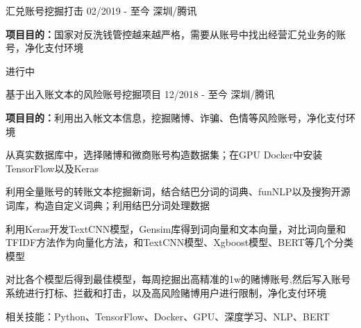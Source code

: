 \vspace{-5pt}
\begin{cventries}

\cventry
    { } %
    {汇兑账号挖掘打击} %
    {02/2019 - 至今} %
    {深圳/腾讯} %
    {
    \vspace{-8pt}
      \begin{cvitems} %
      	\item{\textbf{项目目的：}国家对反洗钱管控越来越严格，需要从账号中找出经营汇兑业务的账号，净化支付环境}
	\item{进行中}
      \end{cvitems}
    }


  \cventry
    { } %
    { 基于出入账文本的风险账号挖掘项目} %
    {12/2018 - 至今} %
    {深圳/腾讯} %
    {
    \vspace{-8pt}
      \begin{cvitems} %
      	\item{\textbf{项目目的：}利用出入帐文本信息，挖掘赌博、诈骗、色情等风险账号，净化支付环境}
        \item {从真实数据库中，选择赌博和微商账号构造数据集；在GPU Docker中安装TensorFlow以及Keras}
        \item {利用全量账号的转账文本挖掘新词，结合结巴分词的词典、funNLP以及搜狗开源词库，构造自定义词典；利用结巴分词处理数据}
        \item{利用Keras开发TextCNN模型，Gensim库得到词向量和文本向量，对比词向量和TFIDF方法作为向量化方法，和TextCNN模型、Xgboost模型、BERT等几个分类模型}
        \item{对比各个模型后得到最佳模型，每周挖掘出高精准的1w的赌博账号,然后写入账号系统进行打标、拦截和打击，以及高风险赌博用户进行限制，净化支付环境}
        \item{相关技能：Python、TensorFlow、Docker、GPU、深度学习、NLP、BERT}
      \end{cvitems}
    }
    

\end{cventries}
